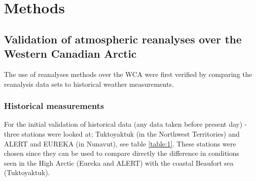 \documentclass[12pt, oneside]{article}
\begin{document}
\section{Methods}
\subsection{Validation of atmospheric reanalyses over the Western Canadian Arctic}
The use of reanalyses methods over the WCA were first verified  by comparing the reanalysis data sets to historical weather measurements.

\subsubsection{Historical measurements}\label{section:historical}
For the initial validation of historical data (any data taken before present day) - three stations were looked at; Tuktoyaktuk (in the Northwest Territories) and ALERT and EUREKA (in Nunavut), see table \ref{table:1}. These stations were chosen since they can be used to compare directly the difference in conditions seen in the High Arctic (Eureka and ALERT) with the coastal Beaufort sea (Tuktoyaktuk). 
\end{document}
